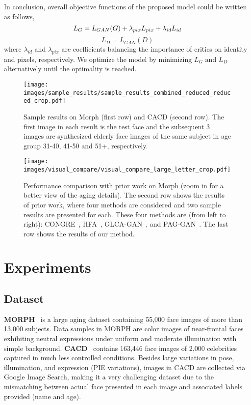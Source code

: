 \documentclass[10pt,twocolumn,letterpaper]{article}
\begin{document}
In conclusion, overall objective functions of the proposed model could be written as follows,
\begin{equation}
L_G=L_{GAN}(G)+\lambda_{pix}L_{pix}+\lambda_{id}L_{id} \\
\end{equation}
\begin{equation}
L_D=L_{GAN}(D)
\end{equation}
where $\lambda_{id}$ and $\lambda_{pix}$ are coefficients balancing the importance of critics on identity and pixels, respectively. We optimize the model by minimizing $L_G$ and $L_D$ alternatively  until the optimality is reached.

\begin{figure*}[ht]
\centering\texttt{[image: images/sample\_results/sample\_results\_combined\_reduced\_reduced\_crop.pdf]}
\caption{Sample results on Morph (first row) and CACD (second row). The first image in each result is the test face and the subsequent 3 images are synthesized elderly face images of the same subject in age group 31-40, 41-50 and 51+, respectively.}
\label{fig:sampleResults}
\end{figure*}

\begin{figure*}[ht]
\centering\texttt{[image: images/visual\_compare/visual\_compare\_large\_letter\_crop.pdf]}
\caption{Performance comparison with prior work on Morph (zoom in for a better view of the aging details). The second row shows the results of prior work, where four methods are considered and two sample results are presented for each. These four methods are (from left to right): CONGRE~\cite{suo2012concatenational}, HFA~\cite{yang2016face}, GLCA-GAN~\cite{li2018global}, and PAG-GAN~\cite{yang2017learning}. The last row shows the results of our method.}
\label{fig:compareResults}
\end{figure*}

\section{Experiments}

\subsection{Dataset}
\textbf{MORPH}~\cite{ricanek2006morph} is a large aging dataset containing 55,000 face images of more than 13,000 subjects. 
Data samples in MORPH are color images of near-frontal faces exhibiting neutral expressions under uniform and moderate illumination with simple background. 
\textbf{CACD}~\cite{chen2015face} contains 163,446 face images of 2,000 celebrities captured in much less controlled conditions. Besides large variations in pose, illumination, and expression (PIE variations), images in CACD are collected via Google Image Search, making it a very challenging dataset due to the mismatching between actual face presented in each image and associated labels provided (name and age).
\end{document}
